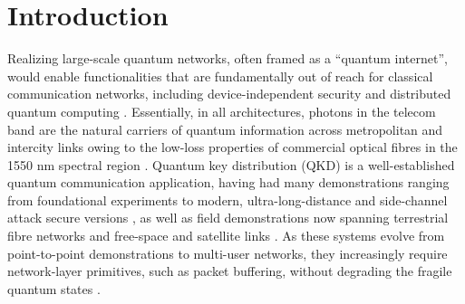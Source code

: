\documentclass[%
reprint,
superscriptaddress,
 amsmath,amssymb,
 aps,
 prx,
floatfix,
]{revtex4-2}
\begin{document}
\begin{abstract}

Packet-switched quantum networks require buffers that can delay qubit payloads while routing information is read out in real time. Previous approaches have not provided this functionality in a fully fibre-integrated architecture compatible with telecom infrastructure. Here we demonstrate an optical-fibre-integrated buffer, based on a recirculating loop and a fibre storage line, in which the storage time of a polarisation-encoded qubit payload is determined by readout of an attached packet header. The key component behind this achievement is an ultra-low-loss poled fibre phase modulator, which provides fast, polarisation-insensitive switching directly in fibre and allows header and payload to be processed within the buffer. We demonstrate storage and retrieval of polarisation-encoded qubit payloads for storage times up to 47 $\mu$s, with an average quantum bit error rate of 1.8\% together with stable operation over several hours. These results establish a practical fibre-based architecture for packet-level quantum network buffering that can easily integrate into the current telecommunication infrastructure opening up new paths for deployment of the quantum internet.



\end{abstract}

\maketitle

\section*{Introduction}

Realizing large-scale quantum networks, often framed as a “quantum internet”, would enable functionalities that are fundamentally out of reach for classical communication networks, including device-independent security and distributed quantum computing \cite{kimble2008quantum,wehner2018quantum}. Essentially, in all architectures, photons in the telecom band are the natural carriers of quantum information across metropolitan and intercity links owing to the low-loss properties of commercial optical fibres in the 1550 nm spectral region \cite{gisin2007quantum, pirandola2020advances}. Quantum key distribution (QKD) is a well-established quantum communication application, having had many demonstrations ranging from foundational experiments to modern, ultra-long-distance and side-channel attack secure versions \cite{bennett1984bb84,ekert1991bell,lo2012mdi,TF2018}, as well as field demonstrations now spanning terrestrial fibre networks and free-space and satellite links \cite{liao2017satelliteqkd,yin2017satelliteentanglement, zhou2024combfield, pittaluga2025deployed}. As these systems evolve from point-to-point demonstrations to multi-user networks, they increasingly require network-layer primitives, such as packet buffering, without degrading the fragile quantum states \cite{wehner2018quantum,pompili2022networkstack}.
\end{document}
